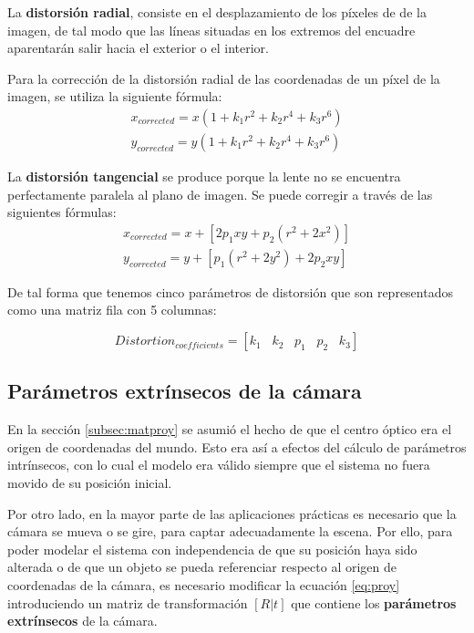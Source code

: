 La \textbf{distorsión radial}, consiste en el desplazamiento de los píxeles de de la imagen, de tal modo que las líneas situadas en los extremos del encuadre aparentarán salir hacia el exterior o el interior.   

Para la corrección de la distorsión radial de las coordenadas de un píxel de la imagen, se utiliza la siguiente fórmula:
\begin{equation}
  \begin{split}
    x_{corrected} = x(1 + k_1 r^2 + k_2 r^4 + k_3 r^6)  \\
    y_{corrected} = y(1 + k_1 r^2 + k_2 r^4 + k_3 r^6)
  \end{split}
\end{equation}

La \textbf{distorsión tangencial} se produce porque la lente no se encuentra perfectamente paralela al plano de imagen. Se puede corregir a través de las siguientes fórmulas:
\begin{equation}
  \begin{split}
    x_{corrected} = x + [ 2p_1xy + p_2(r^2+2x^2)] \\ 
    y_{corrected} = y + [ p_1(r^2+ 2y^2)+ 2p_2xy]
  \end{split}
\end{equation}

De tal forma que tenemos cinco parámetros de distorsión que son representados como una matriz fila con 5 columnas: 

\begin{equation}
  Distortion_{coefficients} = [k_1 \hspace{10pt} k_2 \hspace{10pt} p_1 \hspace{10pt} p_2 \hspace{10pt} k_3]
\end{equation}

\subsection{Parámetros extrínsecos de la cámara}
En la sección \ref{subsec:matproy} se asumió el hecho de que el centro óptico era el origen de coordenadas del mundo. Esto era así a efectos del cálculo de parámetros intrínsecos, con lo cual el modelo era válido siempre que el sistema no fuera movido de su posición inicial.

Por otro lado, en la mayor parte de las aplicaciones prácticas es necesario que la cámara se mueva o se gire, para captar adecuadamente la escena. Por ello, para poder modelar el sistema con independencia de que su posición haya sido alterada o de que un objeto se pueda referenciar respecto al origen de coordenadas de la cámara, es necesario modificar la ecuación \ref{eq:proy} introduciendo un matriz de transformación $[R|t]$ que contiene los \textbf{parámetros extrínsecos} de la cámara. 

